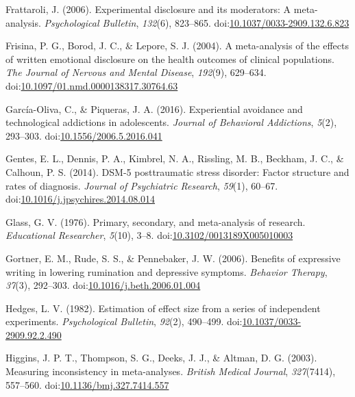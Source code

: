 \documentclass[man]{apa6}
\theoremstyle{definition}
\theoremstyle{definition}
\theoremstyle{definition}
\theoremstyle{remark}
\begin{document}
\hypertarget{ref-Frattaroli2006}{}
Frattaroli, J. (2006). Experimental disclosure and its moderators: A
meta-analysis. \emph{Psychological Bulletin}, \emph{132}(6), 823--865.
doi:\href{https://doi.org/10.1037/0033-2909.132.6.823}{10.1037/0033-2909.132.6.823}

\hypertarget{ref-Frisina2004a}{}
Frisina, P. G., Borod, J. C., \& Lepore, S. J. (2004). A meta-analysis
of the effects of written emotional disclosure on the health outcomes of
clinical populations. \emph{The Journal of Nervous and Mental Disease},
\emph{192}(9), 629--634.
doi:\href{https://doi.org/10.1097/01.nmd.0000138317.30764.63}{10.1097/01.nmd.0000138317.30764.63}

\hypertarget{ref-Garcia-Oliva2016}{}
García-Oliva, C., \& Piqueras, J. A. (2016). Experiential avoidance and
technological addictions in adolescents. \emph{Journal of Behavioral
Addictions}, \emph{5}(2), 293--303.
doi:\href{https://doi.org/10.1556/2006.5.2016.041}{10.1556/2006.5.2016.041}

\hypertarget{ref-Gentes2014}{}
Gentes, E. L., Dennis, P. A., Kimbrel, N. A., Rissling, M. B., Beckham,
J. C., \& Calhoun, P. S. (2014). DSM-5 posttraumatic stress disorder:
Factor structure and rates of diagnosis. \emph{Journal of Psychiatric
Research}, \emph{59}(1), 60--67.
doi:\href{https://doi.org/10.1016/j.jpsychires.2014.08.014}{10.1016/j.jpsychires.2014.08.014}

\hypertarget{ref-Glass1976}{}
Glass, G. V. (1976). Primary, secondary, and meta-analysis of research.
\emph{Educational Researcher}, \emph{5}(10), 3--8.
doi:\href{https://doi.org/10.3102/0013189X005010003}{10.3102/0013189X005010003}

\hypertarget{ref-Gortner2006}{}
Gortner, E. M., Rude, S. S., \& Pennebaker, J. W. (2006). Benefits of
expressive writing in lowering rumination and depressive symptoms.
\emph{Behavior Therapy}, \emph{37}(3), 292--303.
doi:\href{https://doi.org/10.1016/j.beth.2006.01.004}{10.1016/j.beth.2006.01.004}

\hypertarget{ref-Hedges1982}{}
Hedges, L. V. (1982). Estimation of effect size from a series of
independent experiments. \emph{Psychological Bulletin}, \emph{92}(2),
490--499.
doi:\href{https://doi.org/10.1037/0033-2909.92.2.490}{10.1037/0033-2909.92.2.490}

\hypertarget{ref-Higgins2003}{}
Higgins, J. P. T., Thompson, S. G., Deeks, J. J., \& Altman, D. G.
(2003). Measuring inconsistency in meta-analyses. \emph{British Medical
Journal}, \emph{327}(7414), 557--560.
doi:\href{https://doi.org/10.1136/bmj.327.7414.557}{10.1136/bmj.327.7414.557}
\end{document}

